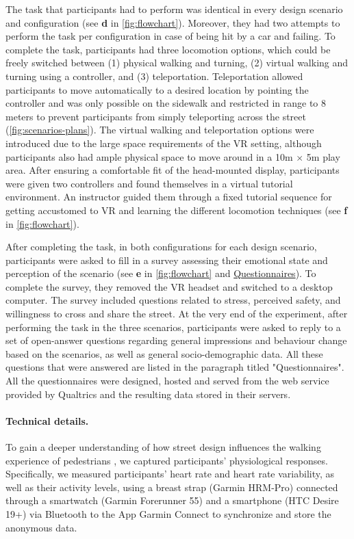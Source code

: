 The task that participants had to perform was identical in every design scenario and configuration (see \textbf{d} in \autoref{fig:flowchart}). Moreover, they had two attempts to perform the task per configuration in case of being hit by a car and failing. To complete the task, participants had three locomotion options, which could be freely switched between (1) physical walking and turning, (2) virtual walking and turning using a controller, and (3) teleportation. Teleportation allowed participants to move automatically to a desired location by pointing the controller and was only possible on the sidewalk and restricted in range to 8 meters to prevent participants from simply teleporting across the street (\autoref{fig:scenarios-plans}). The virtual walking and teleportation options were introduced due to the large space requirements of the VR setting, although participants also had ample physical space to move around in a 10m $\times$ 5m play area. 
After ensuring a comfortable fit of the head-mounted display, participants were given two controllers and found themselves in a virtual tutorial environment. An instructor guided them through a fixed tutorial sequence for getting accustomed to VR and learning the different locomotion techniques (see \textbf{f} in \autoref{fig:flowchart}). 

After completing the task, in both configurations for each design scenario, participants were asked to fill in a survey assessing their emotional state and perception of the scenario (see \textbf{e} in \autoref{fig:flowchart} and \hyperref[apx:quest]{Questionnaires}). To complete the survey, they removed the VR headset and switched to a desktop computer. The survey included questions related to stress, perceived safety, and willingness to cross and share the street.
At the very end of the experiment, after performing the task in the three scenarios, participants were asked to reply to a set of open-answer questions regarding general impressions and behaviour change based on the scenarios, as well as general socio-demographic data. All these questions that were answered are listed in the paragraph titled "Questionnaires". All the questionnaires were designed, hosted and served from the web service provided by Qualtrics and the resulting data stored in their servers.

\paragraph{Technical details.}
To gain a deeper understanding of how street design influences the walking experience of pedestrians \cite{coensel2011effects,wilkie2013influence}, we captured participants' physiological responses. Specifically, we measured participants' heart rate and heart rate variability, as well as their activity levels, using a breast strap (Garmin HRM-Pro) connected through a smartwatch (Garmin Forerunner 55) and a smartphone (HTC Desire 19+) via Bluetooth to the App Garmin Connect to synchronize and store the anonymous data.

